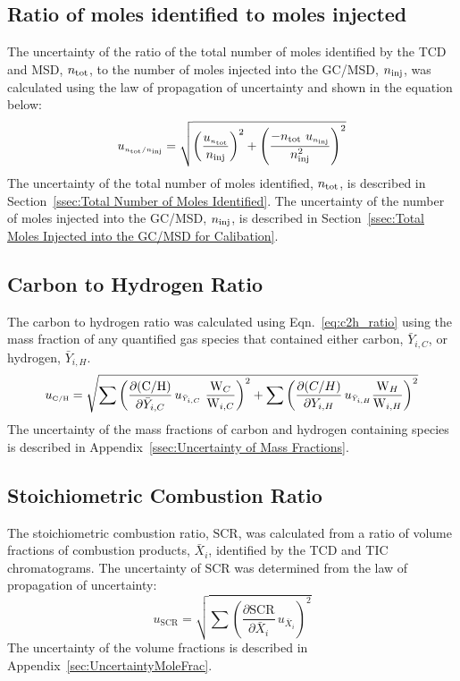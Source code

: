\documentclass[12pt]{article}
\begin{document}
\subsection{Ratio of moles identified to moles injected }
\label{ssec:mole ratio}
The uncertainty of the ratio of the total number of moles identified by the TCD and MSD, $n_{\rm tot}$, to the number of moles injected into the GC/MSD, $n_{\rm inj}$, was calculated using the law of propagation of uncertainty and shown in the equation below:
\begin{equation}
\label{eq:mol_ratio_uncertainty}
u_{\scriptscriptstyle n_{\rm tot}/n_{\rm inj}} = \sqrt{\left(\frac{u_{\scriptscriptstyle n_{\rm tot}}}{n_{\rm inj}}\right)^2 + \left(\frac{-n_{\rm tot}~u_{\scriptscriptstyle n_{\rm inj}}}{{n_{\rm inj}^2}}\right)^2}
\end{equation}
The uncertainty of the total number of moles identified, $n_{\rm tot}$, is described in Section~\ref{ssec:Total Number of Moles Identified}. The uncertainty of the number of moles injected into the GC/MSD, $n_{\rm inj}$, is described in Section~\ref{ssec:Total Moles Injected into the GC/MSD for Calibation}.

\subsection{Carbon to Hydrogen Ratio}
\label{ssec:C2H_ratio}
The carbon to hydrogen ratio was calculated using Eqn.~\ref{eq:c2h_ratio} using the mass fraction of any quantified gas species that contained either carbon, $\bar{Y}_{i,C}$, or hydrogen, $\bar{Y}_{i,H}$.
\begin{equation}
\label{eq:c2h_uncertainty}
u_{\scriptscriptstyle {\rm C}/{\rm H}} = \sqrt{{\sum\left(\frac{\partial ({\rm C}/{\rm H})}{\partial \bar{Y}_{i,C}}\,u_{\scriptscriptstyle \bar{Y}_{i,C}}~{\frac{\textrm{W}_{C}}{\textrm{W}_{i,C}}} \right)}^2+{\sum\left(\frac{\partial ({C}/{H})}{\partial Y_{i,H}}\,u_{\scriptscriptstyle \bar{Y}_{i,H}}{\frac{\textrm{W}_{H}}{\textrm{W}_{i,H}}} \right)}^2}
\end{equation}
The uncertainty of the mass fractions of carbon and hydrogen containing species is described in Appendix~\ref{ssec:Uncertainty of Mass Fractions}.

\subsection{Stoichiometric Combustion Ratio}
\label{ssec:Pro_ratio}
The stoichiometric combustion ratio, $\text{SCR}$, was calculated from a ratio of volume fractions of combustion products, $\bar{X}_{i}$, identified by the TCD and TIC chromatograms. The uncertainty of $\text{SCR}$ was determined from the law of propagation of uncertainty:
\begin{equation}
\label{eq:c2h_ratio_uncertainty}
u_{\scriptscriptstyle \text{SCR}} = \sqrt{{\sum\left(\frac{\partial \text{SCR}}{\partial \bar{X}_{i}}\,u_{\scriptscriptstyle \bar{X}_{i}}\right)}^2}
\end{equation}
The uncertainty of the volume fractions is described in Appendix~\ref{sec:UncertaintyMoleFrac}.
\end{document}
